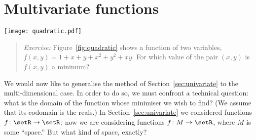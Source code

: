 \documentclass[10pt, a4paper]{article}
\begin{document}
\section{Multivariate functions}
\begin{marginfigure}
  \centering \texttt{[image: quadratic.pdf]}%
\end{marginfigure}
\begin{quote}
  \emph{Exercise:} Figure~\ref{fig:quadratic} shows a function of two
  variables, $f(x,y)=1+x+y+x^2+y^2+xy$. For which value of the pair
  $(x,y)$ is $f(x,y)$ a minimum?
\end{quote}



We would now like to generalise the method of
Section~\ref{sec:univariate} to the multi-dimensional case. In order
to do so, we must confront a technical question: what is the domain of
the function whose minimiser we wish to find? (We assume that its
codomain is the reals.) In Section~\ref{sec:univariate} we considered
functions $f\colon\setR\to\setR$; now we are considering functions
$f\colon M\to \setR$, where $M$ is some “space.” But what kind of space,
exactly?
\end{document}
